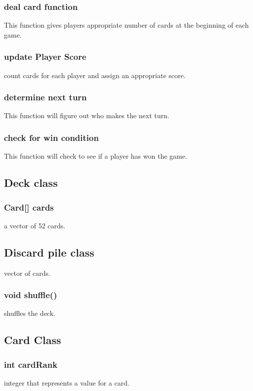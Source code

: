 \subsubsection{deal card function}
    This function gives players appropriate number of cards at the beginning of each game.
\subsubsection{update Player Score }
    count cards for each player and assign an appropriate score.
\subsubsection{determine next turn}
    This function will figure out who makes the next turn.
\subsubsection{check for win condition}
    This function will check to see if a player has won the game.

\subsection{Deck class}

\subsubsection{Card[] cards}
    a vector of 52 cards.

\subsection{Discard pile class}
vector of cards.

\subsubsection{void shuffle()}
    shuffles the deck.
    

\subsection{Card Class}

\subsubsection{int cardRank}
    integer that represents a value for a card.
    
